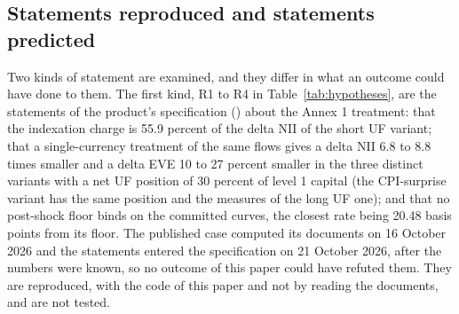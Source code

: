 \subsection{Statements reproduced and statements predicted}
\label{sec:design-hypotheses}

Two kinds of statement are examined, and they differ in what an outcome could have done to them. The first kind, R1 to R4 in Table~\ref{tab:hypotheses}, are the statements of the product's specification () about the Annex 1 treatment: that the indexation charge is 55.9 percent of the delta NII of the short UF variant; that a single-currency treatment of the same flows gives a delta NII 6.8 to 8.8 times smaller and a delta EVE 10 to 27 percent smaller in the three distinct variants with a net UF position of 30 percent of level 1 capital (the CPI-surprise variant has the same position and the measures of the long UF one); and that no post-shock floor binds on the committed curves, the closest rate being 20.48 basis points from its floor. The published case computed its documents on 16 October 2026 and the statements entered the specification on 21 October 2026, after the numbers were known, so no outcome of this paper could have refuted them. They are reproduced, with the code of this paper and not by reading the documents, and are not tested.

